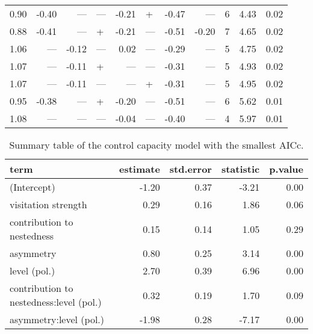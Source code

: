 \documentclass[a4paper]{artikel1}
\theoremstyle{definition}
\theoremstyle{definition}
\theoremstyle{definition}
\theoremstyle{remark}
\begin{document}
\begin{table}
\begin{tabular}[t]{rrrlrlrrrrr}
0.90 & -0.40 & --- & --- & -0.21 & + & -0.47 & --- & 6 & 4.43 & 0.02\\
0.88 & -0.41 & --- & + & -0.21 & --- & -0.51 & -0.20 & 7 & 4.65 & 0.02\\
1.06 & --- & -0.12 & --- & 0.02 & --- & -0.29 & --- & 5 & 4.75 & 0.02\\
1.07 & --- & -0.11 & + & --- & --- & -0.31 & --- & 5 & 4.93 & 0.02\\
1.07 & --- & -0.11 & --- & --- & + & -0.31 & --- & 5 & 4.95 & 0.02\\
0.95 & -0.38 & --- & + & -0.20 & --- & -0.51 & --- & 6 & 5.62 & 0.01\\
1.08 & --- & --- & --- & -0.04 & --- & -0.40 & --- & 4 & 5.97 & 0.01\\
\bottomrule
\end{tabular}
\end{table}

\begin{table}

\caption{\label{tab:tab-model-output-species-level}Summary table of the control capacity model with the smallest AICc.}
\centering
\fontsize{8}{10}\selectfont
\begin{tabular}[t]{lrrrr}
\toprule
term & estimate & std.error & statistic & p.value\\
\midrule
(Intercept) & -1.20 & 0.37 & -3.21 & 0.00\\
visitation strength & 0.29 & 0.16 & 1.86 & 0.06\\
contribution to nestedness & 0.15 & 0.14 & 1.05 & 0.29\\
asymmetry & 0.80 & 0.25 & 3.14 & 0.00\\
level (pol.) & 2.70 & 0.39 & 6.96 & 0.00\\
\addlinespace
contribution to nestedness:level (pol.) & 0.32 & 0.19 & 1.70 & 0.09\\
asymmetry:level (pol.) & -1.98 & 0.28 & -7.17 & 0.00\\
\bottomrule
\end{tabular}
\end{table}
\end{document}
